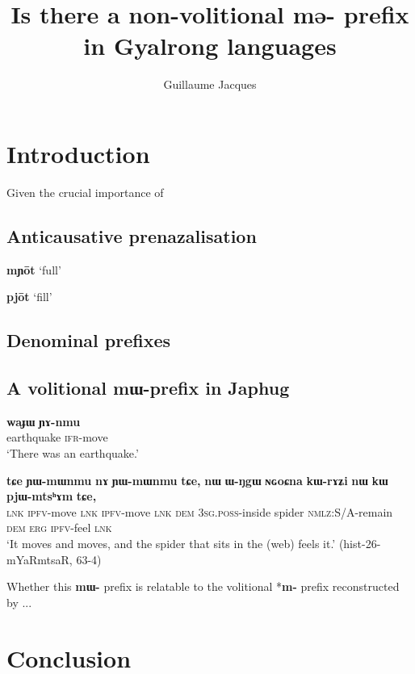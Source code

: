 \documentclass[oneside,a4paper,11pt]{article}
\newcommand{\ipa}[1]{\textbf{{\phon\mbox{#1}}}} %
\begin{document}
\title{Is there a non-volitional \ipa{mə-} prefix in Gyalrong languages}
\author{Guillaume Jacques}
\maketitle

\section*{Introduction}

Given the crucial importance of 
\citet{gong17xingtaixue}


\subsection{Anticausative prenazalisation}
\citet{sagart03prenasalized}
\citet{jacques15spontaneous, jacques15causative}


\citet[330]{huangsun02} \ipa{mɲōt} `full'

\citet[670]{huangsun02} \ipa{pjōt} `fill'

\subsection{Denominal prefixes}

\subsection{A volitional \ipa{mɯ-}prefix in Japhug}
 \citet{jacques16japhug}

\begin{exe}
\ex 
\gll
\ipa{waɟɯ} \ipa{ɲɤ-nmu} \\
earthquake \textsc{ifr}-move \\
\glt `There was an earthquake.'
\end{exe}

\begin{exe}
\ex 
\gll
\ipa{tɕe}	\ipa{ɲɯ-mɯnmu}	\ipa{nɤ}	\ipa{ɲɯ-mɯnmu}	\ipa{tɕe,}	\ipa{nɯ}	\ipa{ɯ-ŋgɯ}	\ipa{ɴɢoɕna}	\ipa{kɯ-rɤʑi}	\ipa{nɯ}	\ipa{kɯ}	\ipa{pjɯ-mtsʰɤm}	\ipa{tɕe,} \\
\textsc{lnk} \textsc{ipfv}-move \textsc{lnk}  \textsc{ipfv}-move \textsc{lnk} \textsc{dem} \textsc{3sg.poss}-inside spider \textsc{nmlz}:S/A-remain \textsc{dem} \textsc{erg} \textsc{ipfv}-feel \textsc{lnk} \\
\glt `It moves and moves, and the spider that sits in the (web) feels it.' (hist-26-mYaRmtsaR, 63-4)
\end{exe}

Whether this \ipa{mɯ-} prefix is relatable to the volitional *\ipa{m-} prefix reconstructed by \citet[55]{bs14oc}...

\section*{Conclusion}



\end{document}
